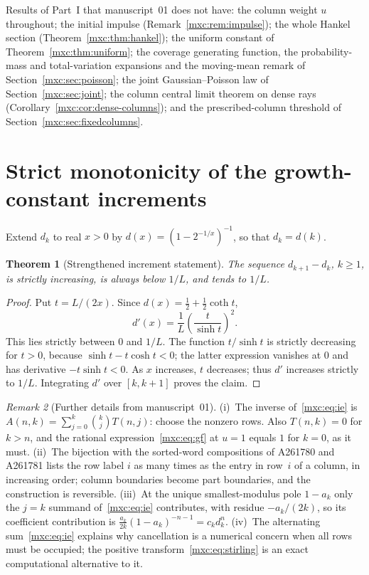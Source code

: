 \documentclass[11pt]{article}
\numberwithin{equation}{section}
\newtheorem{theorem}{Theorem}[section]
\theoremstyle{definition}
\theoremstyle{remark}
\newtheorem{remark}[theorem]{Remark}
\begin{document}
Results of Part~I that manuscript~01 does not have: the column weight $u$
throughout; the initial impulse (Remark~\ref{mxc:rem:impulse}); the whole
Hankel section (Theorem~\ref{mxc:thm:hankel}); the uniform constant of
Theorem~\ref{mxc:thm:uniform}; the coverage generating function, the
probability-mass and total-variation expansions and the moving-mean
remark of Section~\ref{mxc:sec:poisson}; the joint Gaussian--Poisson law
of Section~\ref{mxc:sec:joint}; the column central limit theorem on dense
rays (Corollary~\ref{mxc:cor:dense-columns}); and the prescribed-column
threshold of Section~\ref{mxc:sec:fixedcolumns}.

\section{Strict monotonicity of the growth-constant increments}\label{mxc:tp:sec:monotone}

Extend $d_k$ to real $x>0$ by $d(x)=(1-2^{-1/x})^{-1}$, so that
$d_k=d(k)$.

\begin{theorem}[Strengthened increment statement]\label{mxc:tp:thm:monotone}
The sequence $d_{k+1}-d_k$, $k\ge1$, is strictly increasing, is always
below $1/L$, and tends to $1/L$.
\end{theorem}
\begin{proof}
Put $t=L/(2x)$. Since $d(x)=\frac12+\frac12\coth t$,
\begin{equation}\label{mxc:tp:eq:dprime}
 d'(x)=\frac1L\left(\frac{t}{\sinh t}\right)^2.
\end{equation}
This lies strictly between $0$ and $1/L$. The function $t/\sinh t$ is
strictly decreasing for $t>0$, because $\sinh t-t\cosh t<0$; the latter
expression vanishes at $0$ and has derivative $-t\sinh t<0$. As $x$
increases, $t$ decreases; thus $d'$ increases strictly to $1/L$.
Integrating $d'$ over $[k,k+1]$ proves the claim.
\end{proof}

\begin{remark}[Further details from manuscript~01]\label{mxc:tp:rem:details}
(i)~The inverse of~\eqref{mxc:eq:ie} is
$A(n,k)=\sum_{j=0}^k\binom kjT(n,j)$: choose the nonzero rows. Also
$T(n,k)=0$ for $k>n$, and the rational expression~\eqref{mxc:eq:gf} at
$u=1$ equals $1$ for $k=0$, as it must. (ii)~The bijection with the
sorted-word compositions of A261780 and A261781 lists the row label $i$
as many times as the entry in row~$i$ of a column, in increasing order;
column boundaries become part boundaries, and the construction is
reversible. (iii)~At the unique smallest-modulus pole $1-a_k$ only the
$j=k$ summand of~\eqref{mxc:eq:ie} contributes, with residue $-a_k/(2k)$,
so its coefficient contribution is
$\frac{a_k}{2k}(1-a_k)^{-n-1}=c_kd_k^n$. (iv)~The alternating
sum~\eqref{mxc:eq:ie} explains why cancellation is a numerical concern
when all rows must be occupied; the positive
transform~\eqref{mxc:eq:stirling} is an exact computational alternative
to it.
\end{remark}
\end{document}
